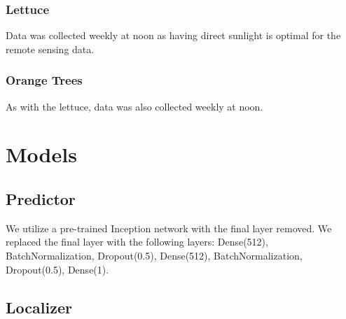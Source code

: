 \subsubsection{Lettuce}
Data was collected weekly at noon as having direct sunlight is optimal for the remote sensing data. 

\subsubsection{Orange Trees}
As with the lettuce, data was also collected weekly at noon.


\section{Models}

\subsection{Predictor}
We utilize a pre-trained Inception network with the final layer removed. We replaced the final layer with the following layers: Dense(512), BatchNormalization, Dropout(0.5), Dense(512), BatchNormalization, Dropout(0.5), Dense(1).

\subsection{Localizer}